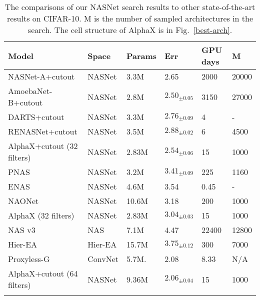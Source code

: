 \documentclass[10pt,twocolumn,letterpaper]{article}
\begin{document}
\begin{table}[t]
\setlength{\tabcolsep}{0.4em}
  \scriptsize
  \label{layers_used}
  \centering
  \begin{tabular}{l l l l l l}
    \toprule
         \textbf{Model}      & \textbf{Space}  & \textbf{Params}  & \textbf{Err} & \textbf{GPU days} & \textbf{M}\\
    \midrule
		  NASNet-A+cutout    \cite{zoph2017learning}        & NASNet    & 3.3M   & 2.65 & 2000 & 20000 \\
		  AmoebaNet-B+cutout \cite{real2018regularized}   & NASNet    & 2.8M   & $2.50_{\pm0.05}$ & 3150 & 27000 \\
  		  DARTS+cutout       \cite{liu2018darts}                & NASNet    & 3.3M   & $2.76_{\pm0.09}$  & 4  & -   \\
		  RENASNet+cutout    \cite{chen2019renas} & NASNet & 3.5M & $2.88_{\pm0.02}$ & 6 & 4500 \\
		  \midrule
		  AlphaX+cutout (32 filters)  		& NASNet			  & 2.83M & $2.54_{\pm0.06}$ & 15  & 1000   \\
		  \midrule
		  PNAS               \cite{liu2017progressive}           & NASNet	  & 3.2M   & $3.41_{\pm0.09}$  & 225  & 1160   \\
		  ENAS               \cite{pham2018efficient}           & NASNet    & 4.6M   & 3.54  & 0.45 &  - \\
		  NAONet             \cite{luo2018neural} & NASNet & 10.6M & 3.18 & 200 & 1000          \\
		  \midrule
          AlphaX (32 filters)  		& NASNet			  & 2.83M & $3.04_{\pm0.03}$         & 15  & 1000   \\
		  
	\midrule
  		  NAS v3\cite{Zoph2016}				     & NAS        	 & 7.1M   & 4.47 & 22400 & 12800  \\ 
          Hier-EA	  \cite{liu2017hierarchical} & Hier-EA       & 15.7M  & $3.75_{\pm0.12}$ & 300  & 7000  \\
		  Proxyless-G \cite{cai2018proxylessnas} & ConvNet       & 5.7M.  & 2.08 & 8.33 & N/A \\
	\midrule
		  AlphaX+cutout (64 filters)  		& NASNet			  & 9.36M & $2.06_{\pm0.04}$ & 15  & 1000   \\		  
    \bottomrule
    \label{acc-comps-cifar}
  \end{tabular}
  \caption{The comparisons of our NASNet search results to other state-of-the-art results on CIFAR-10. M is the number of sampled architectures in the search. The cell structure of AlphaX is in Fig.~\ref{best-arch}.}
  
\end{table}
\end{document}
